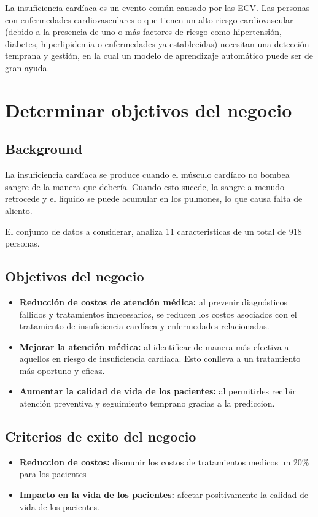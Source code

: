 \documentclass[12pt, letterpaper, spanish]{article}
\begin{document}
La insuficiencia cardíaca es un evento común causado por las ECV.
Las personas con enfermedades cardiovasculares o que tienen un alto riesgo cardiovascular 
(debido a la presencia de uno o más factores de riesgo como hipertensión, diabetes, 
hiperlipidemia o enfermedades ya establecidas) necesitan una detección temprana y gestión, 
en la cual un modelo de aprendizaje automático puede ser de gran ayuda.
\section{Determinar objetivos del negocio}
\subsection{Background}
La insuficiencia cardíaca se produce cuando el músculo cardíaco no bombea sangre 
de la manera que debería. Cuando esto sucede, la sangre a menudo retrocede y 
el líquido se puede acumular en los pulmones, lo que causa falta de aliento.

El conjunto de datos a considerar, analiza 11 caracteristicas de un total de 918 personas.
\subsection{Objetivos del negocio}
  \begin{itemize}
    \item{\textbf{Reducción de costos de atención médica: }
    al prevenir diagnósticos fallidos y tratamientos innecesarios, se reducen los costos
    asociados con el tratamiento de insuficiencia cardíaca y enfermedades relacionadas.}
    \item{\textbf{Mejorar la atención médica:} 
    al identificar de manera más efectiva a aquellos en riesgo de insuficiencia cardíaca. 
    Esto conlleva a un tratamiento más oportuno y eficaz.}
    \item{\textbf{Aumentar la calidad de vida de los pacientes:} 
    al permitirles recibir atención preventiva y seguimiento temprano gracias a la prediccion.}
  \end{itemize}
\subsection{Criterios de exito del negocio}
  \begin{itemize}
    \item{\textbf{Reduccion de costos: }dismunir los costos de tratamientos medicos un 20\%
    para los pacientes}
    \item{\textbf{Impacto en la vida de los pacientes: }afectar positivamente la calidad de vida
    de los pacientes.}
  \end{itemize}
\end{document}
